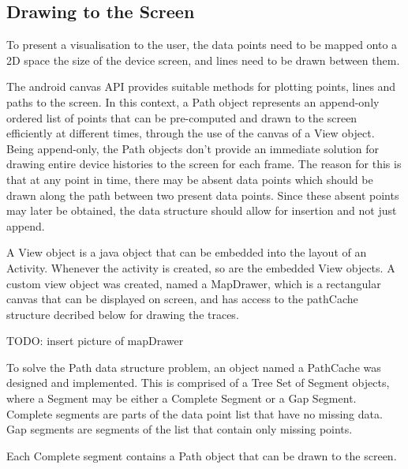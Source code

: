 \subsection{Drawing to the Screen}

To present a visualisation to the user, the data points need to be mapped onto a 2D space the size of the device screen, and lines need to be drawn between them.

The android canvas API provides suitable methods for plotting points, lines and paths to the screen. In this context, a Path object represents an append-only ordered list of points that can be pre-computed and drawn to the screen efficiently at different times, through the use of the canvas of a View object.
Being append-only, the Path objects don't provide an immediate solution for drawing entire device histories to the screen for each frame. The reason for this is that at any point in time, there may be absent data points which should be drawn along the path between two present data points. Since these absent points may later be obtained, the data structure should allow for insertion and not just append.

A View object is a java object that can be embedded into the layout of an Activity. Whenever the activity is created, so are the embedded View objects. A custom view object was created, named a MapDrawer, which is a rectangular canvas that can be displayed on screen, and has access to the pathCache structure decribed below for drawing the traces.

TODO: insert picture of mapDrawer

To solve the Path data structure problem, an object named a PathCache was designed and implemented. This is comprised of a Tree Set of Segment objects, where a Segment may be either a Complete Segment or a Gap Segment. Complete segments are parts of the data point list that have no missing data. Gap segments are segments of the list that contain only missing points.

Each Complete segment contains a Path object that can be drawn to the screen.

